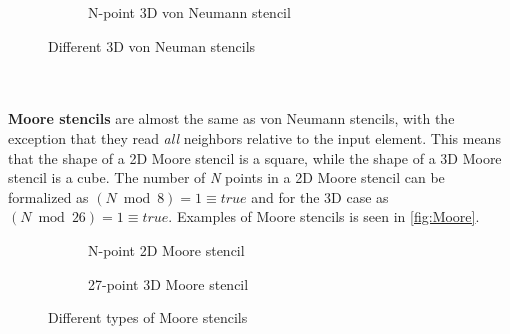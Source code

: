 \begin{figure}[ht]
\begin{subfigure}{.33\textwidth}
{		}
		\caption{N-point 3D von Neumann stencil}
		\label{fig:Np3DNeu}
	\end{subfigure}%
	\caption{Different 3D von Neuman stencils}
	\label{fig:3DvonNeu}
\end{figure}
\\\\
\textbf{Moore stencils} are almost the same as von Neumann stencils, with the exception that  they read \textit{all} neighbors relative to the input element.
This means that the shape of a 2D Moore stencil is a square, while the shape of a 3D Moore stencil is a cube.
The number of \textit{N} points in a 2D Moore stencil can be formalized as $(N\bmod 8)=1\equiv true$ and for the 3D case as $(N\bmod 26)=1\equiv true$.
Examples of Moore stencils is seen in \autoref{fig:Moore}.
\begin{figure}[ht]
	\centering
	\begin{subfigure}{.5\textwidth}
		\centering
		\caption{N-point 2D Moore stencil}
		\label{fig:Np2DMoore}
	\end{subfigure}%
	\begin{subfigure}{.5\textwidth}
		\centering
		\caption{27-point 3D Moore stencil}
		\label{fig:27p3DMoore}
	\end{subfigure}
	\caption{Different types of Moore stencils}
	\label{fig:Moore}
\end{figure}
